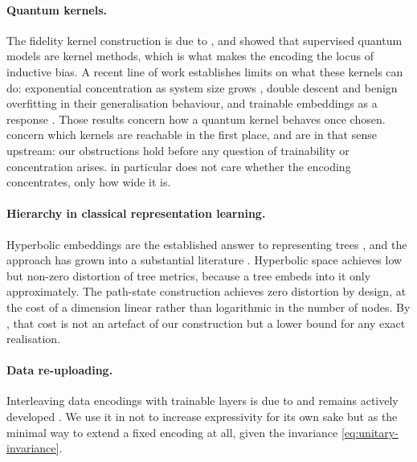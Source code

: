 \paragraph{Quantum kernels.}
The fidelity kernel construction is due to
\citet{HavlicekEtAl2019QuantumEnhanced}, and \citet{Schuld2021KernelMethods} showed
that supervised quantum models are kernel methods, which is what makes the encoding the
locus of inductive bias. A recent line of work establishes limits on what these kernels
can do: exponential concentration as system size grows
\citep{ThanasilpEtAl2024ExponentialConcentration}, double descent
\citep{KempkesEtAl2025DoubleDescent} and benign overfitting
\citep{TomasiEtAl2025BenignOverfitting} in their generalisation behaviour, and trainable
embeddings as a response \citep{RodriguezGrasaEtAl2024NeuralQuantumKernels}. Those
results concern how a quantum kernel behaves once chosen.  concern which kernels are reachable in the first place, and are in
that sense upstream: our obstructions hold before any question of trainability or
concentration arises.  in particular does not care whether
the encoding concentrates, only how wide it is.

\paragraph{Hierarchy in classical representation learning.}
Hyperbolic embeddings are the established answer to representing trees
\citep{NickelKiela2017Poincare}, and the approach has grown into a substantial
literature \citep{HeEtAl2025HyperbolicSurvey}. Hyperbolic space achieves low but
non-zero distortion of tree metrics, because a tree embeds into it only approximately.
The path-state construction achieves zero distortion by design, at the cost of a
dimension linear rather than logarithmic in the number of nodes. By
, that cost is not an artefact of our construction but a
lower bound for any exact realisation.

\paragraph{Data re-uploading.}
Interleaving data encodings with trainable layers is due to
\citet{PerezSalinasEtAl2020DataReuploading} and remains actively developed
\citep{CasseEtAl2024QuantumReuploading}. We use it in  not to
increase expressivity for its own sake but as the minimal way to extend a fixed
encoding at all, given the invariance \cref{eq:unitary-invariance}.
